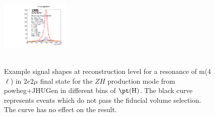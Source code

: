 \begin{figure}[htb]
\begin{center}
{      \includegraphics[width=0.3\textwidth,angle=0]{Figures/Appendix//ZH_powheg_JHUgen_125_2e2mu_pT4l_genbin4_recobin4_effs_genWeight*pileupWeight*dataMCWeight.pdf}
      \label{fig:sigfits-pT4l-ZH-powheg15-JHUgen-125-maintext:e}
    }
     \\
    \\
    \caption{ Example signal shapes at reconstruction level for a resonance of m(4$\ell$) in $2e2\mu$ final state for the $ZH$ production mode from {\sc powheg+JHUGen} in different bins of $\pt(\mathrm{H})$. The black curve represents events which do not pass the fiducial volume selection. The curve has no effect on the result.
    }
  \label{fig:sigfits-pT4l-ZH-powheg15-JHUgen-125-maintext}
 \end{center}
\end{figure} \clearpage

